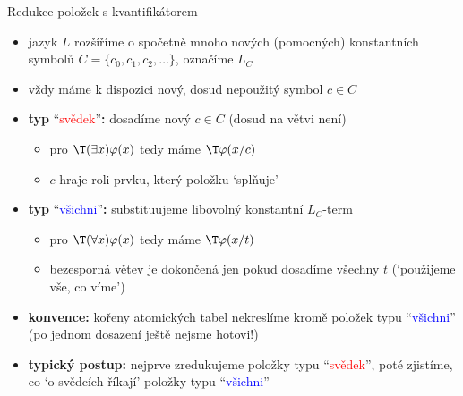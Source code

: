 \documentclass{beamer}
\begin{document}
\begin{frame}{Redukce položek s kvantifikátorem}

    \pause
    \begin{itemize}
        \item jazyk $L$ rozšíříme o spočetně mnoho \alert{nových (pomocných) konstantních symbolů} $C=\{c_0,c_1,c_2,\dots\}$, 
        označíme \alert{$L_C$}\pause
        \item vždy máme k dispozici \alert{nový}, dosud \alert{nepoužitý} symbol $c\in C$\pause
        
        \medskip

        \item \textbf{typ} ``\textcolor{red}{svědek}''\textbf{:} dosadíme \alert{nový} $c\in C$ (dosud na větvi není)\pause
        \begin{itemize}
            \item pro $\T(\exists x)\varphi(x)$ tedy máme $\T\varphi(x/c)$\pause
            \item $c$ hraje roli prvku, který položku `splňuje'\pause
        \end{itemize}

        \medskip

        \item \textbf{typ} ``\textcolor{blue}{všichni}''\textbf{:} substituujeme \alert{libovolný} konstantní $L_C$-term\pause
        \begin{itemize}
            \item pro $\T(\forall x)\varphi(x)$ tedy máme $\T\varphi(x/t)$\pause
            \item bezesporná větev je \alert{dokončená} jen pokud \alert{dosadíme všechny $t$} (`použijeme vše, co víme')\pause
        \end{itemize}

        \medskip

        \item \textbf{konvence:} kořeny atomických tabel nekreslíme \alert{kromě položek typu} ``\textcolor{blue}{všichni}'' (po jednom dosazení ještě nejsme hotovi!)\pause
        
        \medskip
        
        \item \textbf{typický postup:} nejprve zredukujeme položky typu ``\textcolor{red}{svědek}'', poté zjistíme, co `\alert{o svědcích říkají}' položky typu ``\textcolor{blue}{všichni}'' 
        
    \end{itemize}

\end{frame}
\end{document}
